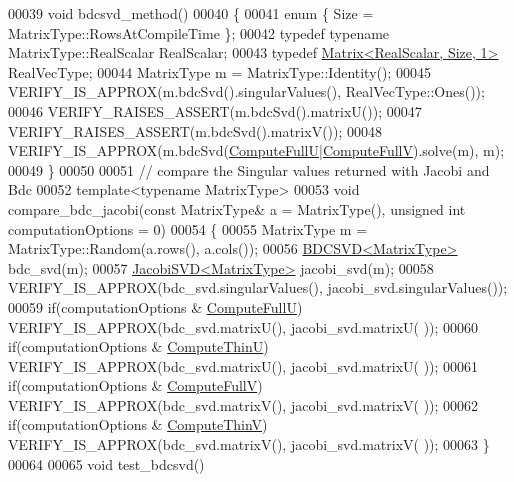 \begin{DoxyCode}
00039 \textcolor{keywordtype}{void} bdcsvd\_method()
00040 \{
00041   \textcolor{keyword}{enum} \{ Size = MatrixType::RowsAtCompileTime \};
00042   \textcolor{keyword}{typedef} \textcolor{keyword}{typename} MatrixType::RealScalar RealScalar;
00043   \textcolor{keyword}{typedef} \hyperlink{group___core___module_class_eigen_1_1_matrix}{Matrix<RealScalar, Size, 1>} RealVecType;
00044   MatrixType m = MatrixType::Identity();
00045   VERIFY\_IS\_APPROX(m.bdcSvd().singularValues(), RealVecType::Ones());
00046   VERIFY\_RAISES\_ASSERT(m.bdcSvd().matrixU());
00047   VERIFY\_RAISES\_ASSERT(m.bdcSvd().matrixV());
00048   VERIFY\_IS\_APPROX(m.bdcSvd(\hyperlink{group__enums_ggae3e239fb70022eb8747994cf5d68b4a9a2b4f91ca5859a4159dbfe8090043817f}{ComputeFullU}|\hyperlink{group__enums_ggae3e239fb70022eb8747994cf5d68b4a9a52c6f7e80bbf9a42297c88f700245b51}{ComputeFullV}).solve(m), m);
00049 \}
00050 
00051 \textcolor{comment}{// compare the Singular values returned with Jacobi and Bdc}
00052 \textcolor{keyword}{template}<\textcolor{keyword}{typename} MatrixType> 
00053 \textcolor{keywordtype}{void} compare\_bdc\_jacobi(\textcolor{keyword}{const} MatrixType& a = MatrixType(), \textcolor{keywordtype}{unsigned} \textcolor{keywordtype}{int} computationOptions = 0)
00054 \{
00055   MatrixType m = MatrixType::Random(a.rows(), a.cols());
00056   \hyperlink{group___s_v_d___module_class_eigen_1_1_b_d_c_s_v_d}{BDCSVD<MatrixType>} bdc\_svd(m);
00057   \hyperlink{group___s_v_d___module_class_eigen_1_1_jacobi_s_v_d}{JacobiSVD<MatrixType>} jacobi\_svd(m);
00058   VERIFY\_IS\_APPROX(bdc\_svd.singularValues(), jacobi\_svd.singularValues());
00059   \textcolor{keywordflow}{if}(computationOptions & \hyperlink{group__enums_ggae3e239fb70022eb8747994cf5d68b4a9a2b4f91ca5859a4159dbfe8090043817f}{ComputeFullU}) VERIFY\_IS\_APPROX(bdc\_svd.matrixU(), jacobi\_svd.matrixU(
      ));
00060   \textcolor{keywordflow}{if}(computationOptions & \hyperlink{group__enums_ggae3e239fb70022eb8747994cf5d68b4a9af8c742a1aa87773e165eae406c9ccaf8}{ComputeThinU}) VERIFY\_IS\_APPROX(bdc\_svd.matrixU(), jacobi\_svd.matrixU(
      ));
00061   \textcolor{keywordflow}{if}(computationOptions & \hyperlink{group__enums_ggae3e239fb70022eb8747994cf5d68b4a9a52c6f7e80bbf9a42297c88f700245b51}{ComputeFullV}) VERIFY\_IS\_APPROX(bdc\_svd.matrixV(), jacobi\_svd.matrixV(
      ));
00062   \textcolor{keywordflow}{if}(computationOptions & \hyperlink{group__enums_ggae3e239fb70022eb8747994cf5d68b4a9a1055e53fa95c8ae04a07ebb72cfafd95}{ComputeThinV}) VERIFY\_IS\_APPROX(bdc\_svd.matrixV(), jacobi\_svd.matrixV(
      ));
00063 \}
00064 
00065 \textcolor{keywordtype}{void} test\_bdcsvd()

\end{DoxyCode}
